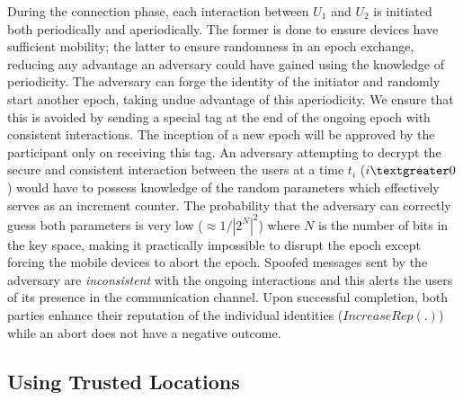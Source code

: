 \documentclass[letterpaper,twocolumn]{sig-alternate}
\begin{document}
During the connection phase, each interaction between $U_1$ and $U_2$ is initiated both periodically and aperiodically. The former is done to ensure devices have sufficient mobility; the latter to ensure randomness in an epoch exchange, reducing any advantage an adversary could have gained using the knowledge of periodicity. The adversary can forge the identity of the initiator and randomly start another epoch, taking undue advantage of this aperiodicity. We ensure that this is avoided by sending a special tag at the end of the ongoing epoch with consistent interactions. The inception of a new epoch will be approved by the participant only on receiving this tag. An adversary attempting to decrypt the secure and consistent interaction between the users at a time $t_i$ ($i \textgreater 0$) would have to possess knowledge of the random parameters which effectively serves as an increment counter. The probability that the adversary can correctly guess both parameters is very low ($\approx 1/|2^N|^2$) where $N$ is the number of bits in the key space, making it practically impossible to disrupt the epoch except forcing the mobile devices to abort the epoch. Spoofed messages sent by the adversary are \textit{inconsistent} with the ongoing interactions and this alerts the users of its presence in the communication channel. Upon successful completion, both parties enhance their reputation of the individual identities ($IncreaseRep(.)$) while an abort does not have a negative outcome.

\subsection{Using Trusted Locations} 
\label{tl}
\end{document}
